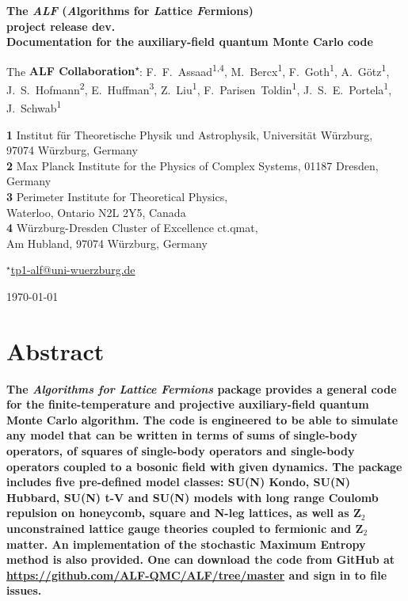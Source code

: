 \documentclass[submission, PhysCodeb]{SciPost}
\newcommand{\ALFver}{dev.}          %
\newcommand{\ALFbranch}{master}   %
\newcommand{\Ztwo}{\mathbf{Z}_{2}}
\begin{document}
	
\begin{center}{\Large \textbf{
The \emph{ALF} (\emph{A}lgorithms for \emph{L}attice \emph{F}ermions)\\project release \ALFver\\
{\normalsize Documentation for the  auxiliary-field quantum Monte Carlo code}
}}\end{center}

\begin{center}
The \textbf{ALF Collaboration\textsuperscript{$\star$}}:
F.~F.~Assaad\textsuperscript{1,4},
M.~Bercx\textsuperscript{1},
F.~Goth\textsuperscript{1},
A.~G\"otz\textsuperscript{1},
J.~S.~Hofmann\textsuperscript{2},
E.~Huffman\textsuperscript{3},
Z.~Liu\textsuperscript{1},
F.~Parisen~Toldin\textsuperscript{1},
J.~S.~E.~Portela\textsuperscript{1},
J.~Schwab\textsuperscript{1}
\end{center}

\begin{center}
{\bf 1} Institut f\"ur Theoretische Physik und Astrophysik, Universit\"at W\"urzburg,\\
97074 W\"urzburg, Germany\\
{\bf 2} Max Planck Institute for the Physics of Complex Systems, 01187 Dresden, Germany\\
{\bf 3} Perimeter Institute for Theoretical Physics,\\
Waterloo, Ontario N2L 2Y5, Canada\\
{\bf 4} W\"urzburg-Dresden Cluster of Excellence ct.qmat, \\ Am Hubland, 97074 W\"urzburg, Germany

${}^\star$\href{mailto:tp1-alf@uni-wuerzburg.de}{\small \sf tp1-alf@uni-wuerzburg.de}
\end{center}

\begin{center}
\today
\end{center}


\section*{Abstract}
{\bf
The \emph{Algorithms for Lattice Fermions} package provides a general code for the finite-temperature and projective auxiliary-field quantum Monte Carlo algorithm. The code is engineered to be able to simulate any model that can be written in terms of sums of single-body operators, of squares of single-body operators and single-body operators coupled to a bosonic field with given dynamics.   The package includes five pre-defined model classes:  SU(N) Kondo, SU(N) Hubbard, SU(N) t-V and SU(N) models with long range Coulomb repulsion on honeycomb, square and N-leg lattices, as well as $\Ztwo$  unconstrained lattice gauge theories coupled to fermionic and $\Ztwo$ matter. An implementation of the stochastic  Maximum Entropy  method is also provided. 
One can download the code from GitHub at \url{https://github.com/ALF-QMC/ALF/tree/\ALFbranch} and sign in to file issues.} \\
\end{document}
